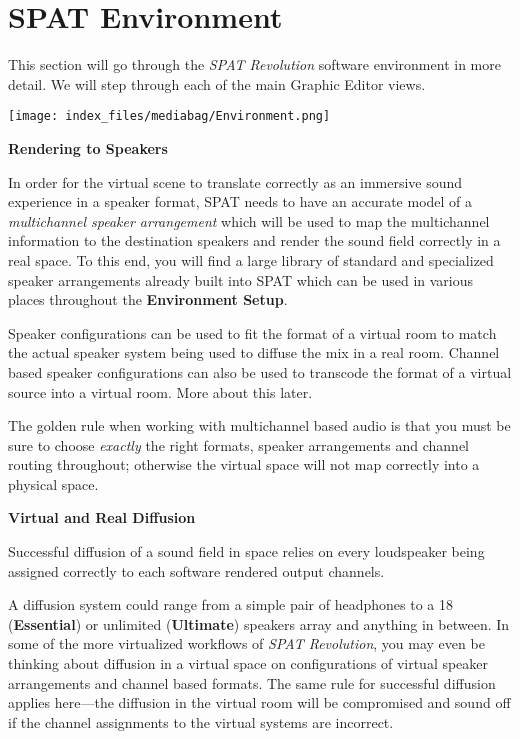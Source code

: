 \documentclass[
  letterpaper,
  DIV=11,
  numbers=noendperiod]{scrreport}
\begin{document}
\part{SPAT Environment}

This section will go through the \emph{SPAT Revolution} software
environment in more detail. We will step through each of the main
Graphic Editor views.

\texttt{[image: index\_files/mediabag/Environment.png]}

\textbf{Rendering to Speakers}

In order for the virtual scene to translate correctly as an immersive
sound experience in a speaker format, SPAT needs to have an accurate
model of a \emph{multichannel speaker arrangement} which will be used to
map the multichannel information to the destination speakers and render
the sound field correctly in a real space. To this end, you will find a
large library of standard and specialized speaker arrangements already
built into SPAT which can be used in various places throughout the
\textbf{Environment Setup}.

Speaker configurations can be used to fit the format of a virtual room
to match the actual speaker system being used to diffuse the mix in a
real room. Channel based speaker configurations can also be used to
transcode the format of a virtual source into a virtual room. More about
this later.

The golden rule when working with multichannel based audio is that you
must be sure to choose \emph{exactly} the right formats, speaker
arrangements and channel routing throughout; otherwise the virtual space
will not map correctly into a physical space.

\textbf{Virtual and Real Diffusion}

Successful diffusion of a sound field in space relies on every
loudspeaker being assigned correctly to each software rendered output
channels.

A diffusion system could range from a simple pair of headphones to a 18
(\textbf{Essential}) or unlimited (\textbf{Ultimate}) speakers array and
anything in between. In some of the more virtualized workflows of
\emph{SPAT Revolution}, you may even be thinking about diffusion in a
virtual space on configurations of virtual speaker arrangements and
channel based formats. The same rule for successful diffusion applies
here---the diffusion in the virtual room will be compromised and sound
off if the channel assignments to the virtual systems are incorrect.
\end{document}
